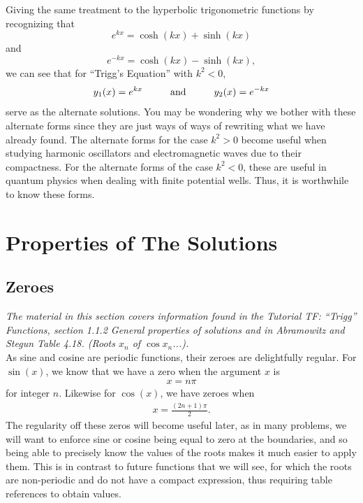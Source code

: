 \documentclass[11pt]{report}
\newcommand{\fpar}[1]{\left({#1}\right)}
\begin{document}
Giving the same treatment to the hyperbolic trigonometric functions by recognizing that
    \begin{equation*}
        e^{kx} = \cosh\fpar{kx}+\sinh\fpar{kx}
    \end{equation*}
and
    \begin{equation*}
        e^{-kx} = \cosh\fpar{kx}-\sinh\fpar{kx},
    \end{equation*}
we can see that for ``Trigg's Equation'' with $k^2<0$,
    \begin{equation}
        y_1(x) = e^{kx} \text{\hspace{1cm}and\hspace{1cm}} y_2(x) = e^{-kx}
    \end{equation}
serve as the alternate solutions. You may be wondering why we bother with these alternate forms since they are just ways of ways of rewriting what we have already found. The alternate forms for the case $k^2>0$ become useful when studying harmonic oscillators and electromagnetic waves due to their compactness. For the alternate forms of the case $k^2<0$, these are useful in quantum physics when dealing with finite potential wells. Thus, it is worthwhile to know these forms.



\section{Properties of The Solutions}
\subsection{Zeroes}

\emph{The material in this section covers information found in the Tutorial TF: “Trigg” Functions, section 1.1.2 General properties of solutions and in Abramowitz and Stegun Table 4.18. (Roots $x_n$ of $\cos{x_n}$...).}\\

As sine and cosine are periodic functions, their zeroes are delightfully regular. For 
$\sin{\fpar{x}}$, we know that we have a zero when the argument $x$ is
    \begin{align}
        x = n\pi
    \end{align}
for integer $n$. Likewise for $\cos{\fpar{x}}$, we have zeroes when
\begin{align}
        x = \frac{(2n+1)\pi}{2}.
    \end{align}
The regularity off these zeros will become useful later, as in many problems, we will want to enforce sine or cosine being equal to zero at the boundaries, and so being able to precisely know the values of the roots makes it much easier to apply them. This is in contrast to future functions that we will see, for which the roots are non-periodic and do not have a compact expression, thus requiring table references to obtain values. 
\end{document}
